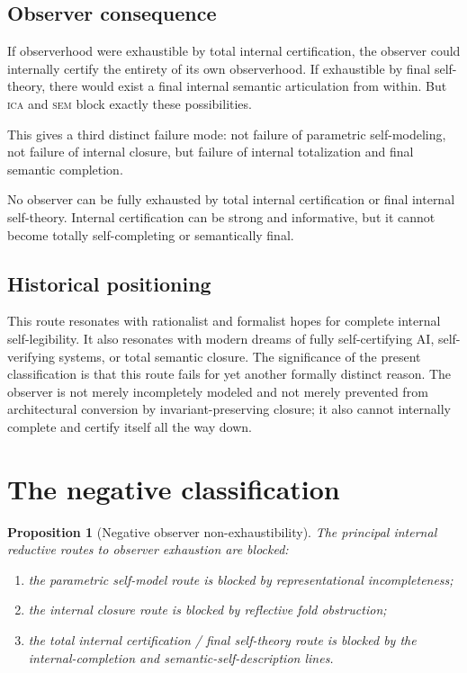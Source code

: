 \documentclass[11pt]{article}
\theoremstyle{plain}
\newtheorem{proposition}[theorem]{Proposition}
\theoremstyle{definition}
\theoremstyle{remark}
\newcommand{\ICA}{\textsc{ica}}
\newcommand{\SEM}{\textsc{sem}}
\begin{document}
\subsection*{Observer consequence}

If observerhood were exhaustible by total internal certification, the
observer could internally certify the entirety of its own observerhood.
If exhaustible by final self-theory, there would exist a final internal
semantic articulation from within.  But \ICA{} and \SEM{} block exactly
these possibilities.

This gives a third distinct failure mode: not failure of parametric
self-modeling, not failure of internal closure, but failure of internal
totalization and final semantic completion.

\begin{keybox}[title={Route C is blocked}]
No observer can be fully exhausted by total internal certification or
final internal self-theory.  Internal certification can be strong and
informative, but it cannot become totally self-completing or semantically
final.
\end{keybox}

\subsection*{Historical positioning}

This route resonates with rationalist and formalist hopes for complete
internal self-legibility.  It also resonates with modern dreams of fully
self-certifying AI, self-verifying systems, or total semantic closure.
The significance of the present classification is that this route fails for
yet another formally distinct reason.  The observer is not merely
incompletely modeled and not merely prevented from architectural
conversion by invariant-preserving closure; it also cannot internally
complete and certify itself all the way down.

\section{The negative classification}
\label{sec:negative}

\begin{proposition}[Negative observer non-exhaustibility]
\label{prop:neg}
The principal internal reductive routes to observer exhaustion are
blocked:
\begin{enumerate}[label=(\roman*),leftmargin=2.2em]
\item the parametric self-model route is blocked by representational
      incompleteness;
\item the internal closure route is blocked by reflective fold
      obstruction;
\item the total internal certification / final self-theory route is
      blocked by the internal-completion and semantic-self-description
      lines.
\end{enumerate}
\end{proposition}
\end{document}

